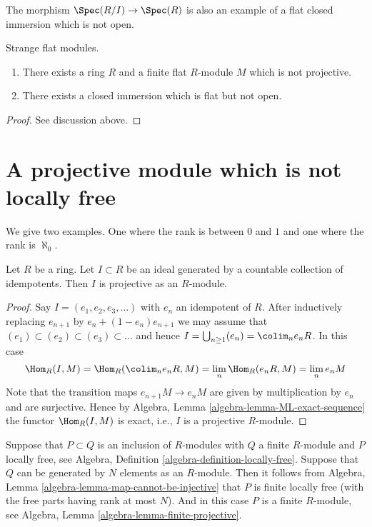 \medskip\noindent
The morphism $\Spec(R/I) \to \Spec(R)$ is also
an example of a flat closed immersion which is not open.

\begin{lemma}
\label{lemma-finite-flat-non-projective}
Strange flat modules.
\begin{enumerate}
\item There exists a ring $R$ and a finite flat $R$-module $M$ which is
not projective.
\item There exists a closed immersion which is flat but not open.
\end{enumerate}
\end{lemma}

\begin{proof}
See discussion above.
\end{proof}



\section{A projective module which is not locally free}
\label{section-projective-not-locally-free}

\noindent
We give two examples. One where the rank is between $0$ and $1$
and one where the rank is $\aleph_0$.

\begin{lemma}
\label{lemma-ideal-generated-by-idempotents-projective}
Let $R$ be a ring. Let $I \subset R$ be an ideal generated by
a countable collection of idempotents. Then $I$ is projective
as an $R$-module.
\end{lemma}

\begin{proof}
Say $I = (e_1, e_2, e_3, \ldots)$ with $e_n$ an idempotent of $R$.
After inductively replacing $e_{n + 1}$ by $e_n + (1 - e_n)e_{n + 1}$
we may assume that $(e_1) \subset (e_2) \subset (e_3) \subset \ldots$
and hence $I = \bigcup_{n \geq 1} (e_n) = \colim_n e_nR$.
In this case
$$
\Hom_R(I, M) = \Hom_R(\colim_n e_nR, M)
= \lim_n \Hom_R(e_nR, M) = \lim_n e_nM
$$
Note that the transition maps $e_{n + 1}M \to e_nM$ are given
by multiplication by $e_n$ and are surjective. Hence by
Algebra, Lemma \ref{algebra-lemma-ML-exact-sequence}
the functor $\Hom_R(I, M)$ is exact, i.e., $I$ is a projective
$R$-module.
\end{proof}

\noindent
Suppose that $P \subset Q$ is an inclusion of $R$-modules with $Q$ a
finite $R$-module and $P$ locally free, see
Algebra, Definition \ref{algebra-definition-locally-free}.
Suppose that $Q$ can be generated by $N$ elements as an $R$-module.
Then it follows from
Algebra, Lemma \ref{algebra-lemma-map-cannot-be-injective}
that $P$ is finite locally free (with the free parts having rank
at most $N$). And in this case $P$ is a finite $R$-module, see
Algebra, Lemma \ref{algebra-lemma-finite-projective}.

